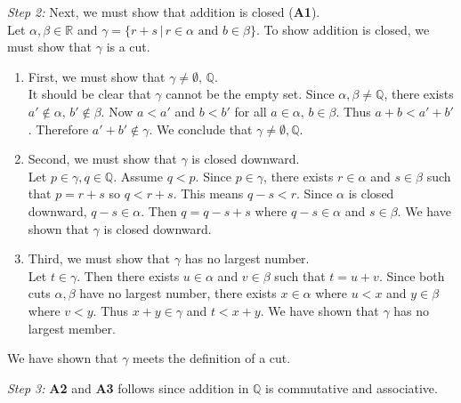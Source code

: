 \documentclass[../main.tex]{subfiles}
\begin{document}
\emph{Step 2:} Next, we must show that addition is closed (\textbf{A1}). \\
Let \( \alpha, \beta \in \mathbb{R} \) and \( \gamma = \{r+s \, | \, r \in \alpha \text{ and } b \in \beta \} \).
To show addition is closed, we must show that \( \gamma \) is a cut.
\begin{enumerate}
    \item First, we must show that \( \gamma \neq \emptyset, \, \mathbb{Q} \). \\
    It should be clear that \( \gamma \) cannot be the empty set.
    Since \( \alpha, \beta \neq \mathbb{Q} \), there exists \( a' \notin \alpha, \, b' \notin \beta \).
    Now \( a < a' \) and \( b < b' \) for all \( a \in \alpha, \, b \in \beta \). Thus \( a + b < a' + b' \).
    Therefore \( a' + b' \notin \gamma \). We conclude that \( \gamma \neq \emptyset, \mathbb{Q} \).

    \item Second, we must show that \( \gamma \) is closed downward. \\
    Let \( p \in \gamma, q \in \mathbb{Q} \). Assume \( q < p \).
    Since \( p \in  \gamma \), there exists \( r \in \alpha \) and \( s \in \beta \) such that \( p = r+s \) so \( q < r+s \).
    This means \( q-s < r \). Since \( \alpha \) is closed downward, \( q-s \in \alpha \).
    Then \( q = q-s +s \) where \( q-s \in \alpha \) and \( s \in \beta \). We have shown that \( \gamma \) is closed downward.

    \item Third, we must show that \( \gamma \) has no largest number. \\
    Let \( t \in \gamma \). Then there exists \( u \in \alpha \) and \( v \in \beta \) such that \( t = u + v \).
    Since both cuts \( \alpha, \beta \) have no largest number, there exists \( x \in \alpha \) where \( u < x \) and \( y \in \beta \) where \( v < y \).
    Thus \( x + y \in \gamma \) and \( t < x + y \). We have shown that \( \gamma \) has no largest member.
\end{enumerate}
We have shown that \( \gamma \) meets the definition of a cut.

\emph{Step 3:} \textbf{A2} and \textbf{A3} follows since addition in \( \mathbb{Q} \) is commutative and associative.
    
\end{document}
